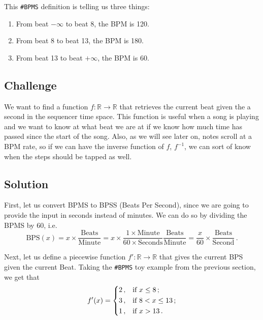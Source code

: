 \documentclass[a4paper,9pt]{article}
\begin{document}
    This \texttt{\#BPMS} definition is telling us three things:
    \begin{enumerate}
	    \item From beat $- \infty$ to beat 8, the BPM is 120.
	    \item From beat 8 to beat 13, the BPM is 180.
	    \item From beat 13 to beat $+\infty$, the BPM is 60.
    \end{enumerate}

    \subsection{Challenge}

    We want to find a function $f : \mathbb{R} \rightarrow \mathbb{R}$ that retrieves the current beat given the a second in the sequencer time space.  This function is useful when a song is playing and we want to know at what beat we are at if we know how much time has passed since the start of the song. Also, as we will see later on, notes scroll at a BPM rate, so if we can have the inverse function of $f$, $ f^{-1} $, we can sort of know when the steps should be tapped as well.

    \subsection{Solution}

    First, let us convert BPMS to BPSS (Beats Per Second), since we are going to provide the input in seconds instead of minutes. We can do so by dividing the BPMS by 60, i.e.
    \begin{equation}
	    \text{BPS}(x) = x \times \frac{\text{Beats}}{\text{Minute}} = x \times \frac{1 \times \text{Minute}}{60 \times \text{Seconds}} \frac{\text{Beats}}{\text{Minute}} = \frac{x}{60} \times \frac{\text{Beats}}{\text{Second}}\,. 
	    \label{eq:bpm2bps}
    \end{equation}

    Next, let us define a piecewise function $f': \mathbb{R} \rightarrow \mathbb{R}$ that gives the current BPS given the current Beat. Taking the \texttt{\#BPMS} toy example from the previous section, we get that
    \begin{equation}
	    f'(x) = \begin{dcases}
		    2\,, & \text{if $x \leq 8\,;$}\\ 
		    3\,, & \text{if $8 < x \leq 13\,;$}\\ 
		    1\,, & \text{if $x > 13\,.$}\\ 
	    \end{dcases}
	    \label{eq:beat2bps}
    \end{equation}
\end{document}
